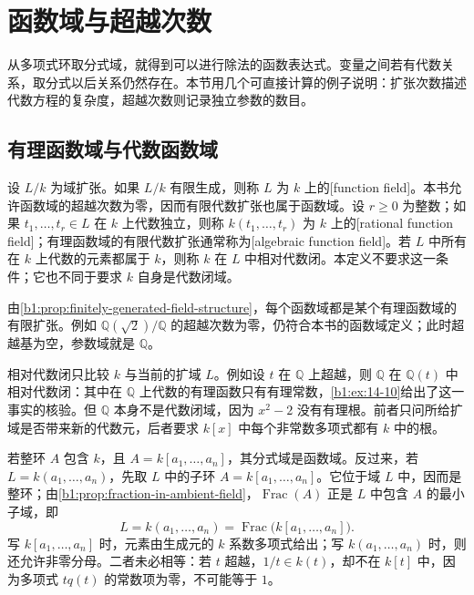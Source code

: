
\section{函数域与超越次数}
\label{b1:sec:1404}


%
%
%

从多项式环取分式域，就得到可以进行除法的函数表达式。变量之间若有代数关系，取分式以后关系仍然存在。本节用几个可直接计算的例子说明：扩张次数描述代数方程的复杂度，超越次数则记录独立参数的数目。

\subsection{有理函数域与代数函数域}
\label{b1:subsec:1404:01}

\begin{definition}\label{b1:def:function-field}
	设 \(L/k\) 为域扩张。如果 \(L/k\) 有限生成，则称 \(L\) 为 \(k\) 上的[function field]。本书允许函数域的超越次数为零，因而有限代数扩张也属于函数域。设 \(r\geq0\) 为整数；如果 \(t_1,\ldots,t_r\in L\) 在 \(k\) 上代数独立，则称 \(k(t_1,\ldots,t_r)\) 为 \(k\) 上的[rational function field]；有理函数域的有限代数扩张通常称为[algebraic function field]。若 \(L\) 中所有在 \(k\) 上代数的元素都属于 \(k\)，则称 \(k\) 在 \(L\) 中相对代数闭。本定义不要求这一条件；它也不同于要求 \(k\) 自身是代数闭域。
\end{definition}
由\cref{b1:prop:finitely-generated-field-structure}，每个函数域都是某个有理函数域的有限扩张。例如 \(\mathbb Q(\sqrt2)/\mathbb Q\) 的超越次数为零，仍符合本书的函数域定义；此时超越基为空，参数域就是 \(\mathbb Q\)。

\ProseParagraphBreak
相对代数闭只比较 \(k\) 与当前的扩域 \(L\)。例如设 \(t\) 在 \(\mathbb Q\) 上超越，则 \(\mathbb Q\) 在 \(\mathbb Q(t)\) 中相对代数闭：其中在 \(\mathbb Q\) 上代数的有理函数只有有理常数，\cref{b1:ex:14-10}给出了这一事实的核验。但 \(\mathbb Q\) 本身不是代数闭域，因为 \(x^2-2\) 没有有理根。前者只问所给扩域是否带来新的代数元，后者要求 \(k[x]\) 中每个非常数多项式都有 \(k\) 中的根。

\ProseParagraphBreak
若整环 \(A\) 包含 \(k\)，且 \(A=k[a_1,\ldots,a_n]\)，其分式域是函数域。反过来，若 \(L=k(a_1,\ldots,a_n)\)，先取 \(L\) 中的子环 \(A=k[a_1,\ldots,a_n]\)。它位于域 \(L\) 中，因而是整环；由\cref{b1:prop:fraction-in-ambient-field}，\(\operatorname{Frac}(A)\) 正是 \(L\) 中包含 \(A\) 的最小子域，即
\[
	L=k(a_1,\ldots,a_n)=\operatorname{Frac}\bigl(k[a_1,\ldots,a_n]\bigr).
\]
写 \(k[a_1,\ldots,a_n]\) 时，元素由生成元的 \(k\) 系数多项式给出；写 \(k(a_1,\ldots,a_n)\) 时，则还允许非零分母。二者未必相等：若 \(t\) 超越，\(1/t\in k(t)\)，却不在 \(k[t]\) 中，因为多项式 \(tq(t)\) 的常数项为零，不可能等于 \(1\)。

